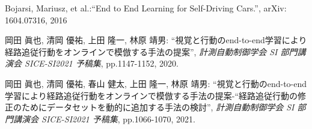 \documentclass[10pt]{ujarticle}
\begin{document}
    \vspace{5truemm}
    {\footnotesize
        \begin{thebibliography}{99}

            Bojarsi, Mariusz, et al.:``End to End Learning for Self-Driving Cars.'', arXiv: 1604.07316, 2016
            
            岡田 眞也, 清岡 優祐, 上田 隆一, 林原 靖男: ``視覚と行動のend-to-end学習により経路追従行動をオンラインで模倣する手法の提案'', \textit{計測自動制御学会 SI 部門講演会 SICE-SI2021 予稿集}, pp.1147-1152, 2020.

            岡田 眞也, 清岡 優祐, 春山 健太, 上田 隆一, 林原 靖男: ``視覚と行動のend-to-end学習により経路追従行動をオンラインで模倣する手法の提案-“経路追従行動の修正のためにデータセットを動的に追加する手法の検討'', \textit{計測自動制御学会 SI 部門講演会 SICE-SI2021 予稿集}, pp.1066-1070, 2021.
            
        \end{thebibliography}
    }
    \normalsize
    
\end{document}
